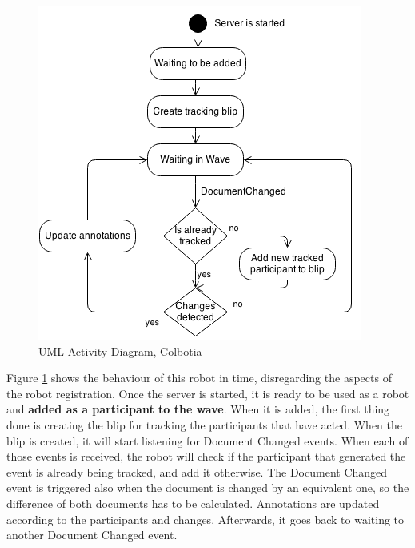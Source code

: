 \begin{figure}[h]
  \center
    \includegraphics[keepaspectratio, scale=0.65]{Media/Diagrams/Robot/RobotActivity.png}
  \caption{UML Activity Diagram, Colbotia}
  \label{fig:colorizer_activity_diagram}
\end{figure}
Figure \ref{fig:colorizer_activity_diagram} shows the behaviour of this robot in time, disregarding the aspects of the robot registration. Once the server is started, it is ready to be used as a robot and \textbf{added as a participant to the wave}. When it is added, the first thing done is creating the blip for tracking the participants that have acted. When the blip is created, it will start listening for Document Changed events. When each of those events is received, the robot will check if the participant that generated the event is already being tracked, and add it otherwise. The Document Changed event is triggered also when the document is changed by an equivalent one, so the difference of both documents has to be calculated. Annotations are updated according to the participants and changes. Afterwards, it goes back to waiting to another Document Changed event.

